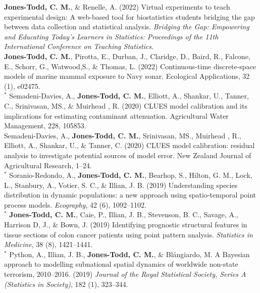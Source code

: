\documentclass[10pt,a4paper]{moderncv}
\begin{document}
  \textbf{Jones-Todd, C. M.}, \& Renelle, A. (2022) Virtual experiments to teach experimental design: A web-based tool for biostatistics students bridging the gap between data collection and statistical analysis. \textit{Bridging the Gap: Empowering and Educating Today's Learners in Statistics: Proceedings of the 11th International Conference on Teaching Statistics}.\\
  
  \textbf{Jones-Todd, C. M.}, Pirotta, E., Durban, J., Claridge, D., Baird, R., Falcone, E., Schorr, G., Watwood,S., \& Thomas, L.  (2022) Continuous-time discrete-space models of marine mammal exposure to Navy sonar. Ecological Applications, 32 (1), e02475.\\
 
  ${}^\ast$ Semadeni-Davies, A., \textbf{Jones-Todd, C. M.},  Elliott, A., Shankar, U., Tanner, C., Srinivasan, MS., \& Muirhead , R. (2020) CLUES model calibration and its implications for estimating contaminant attenuation. Agricultural Water Management, 228, 105853.\\

    Semadeni-Davies, A., \textbf{Jones-Todd, C. M.}, Srinivasan, MS.,  Muirhead , R.,  Elliott, A., Shankar, U., \& Tanner, C. (2020) CLUES model calibration: residual analysis to investigate potential sources of model error. New Zealand Journal of Agricultural Research, 1--24.\\

${}^\ast$ Soranio-Redondo, A., \textbf{Jones-Todd, C. M.}, Bearhop, S., Hilton, G. M., Lock, L., Stanbury, A., Votier, S. C., \& Illian, J. B. (2019) Understanding species distribution in dynamic populations: a new approach using spatio-temporal point process models. \textit{Ecography}, 42 (6), 1092--1102.\\
  
\vspace{-3pt}
${}^\ast$ \textbf{Jones-Todd, C. M.}, Caie, P., Illian, J. B., Stevenson, B. C., Savage, A., Harrison D, J., \& Bown, J. (2019) Identifying prognostic structural features in tissue sections of colon cancer patients using point pattern analysis. \textit{Statistics in Medicine}, 38 (8), 1421--1441.\\

\vspace{-3pt}
${}^\ast$ Python, A.,  Illian, J. B., \textbf{Jones-Todd, C. M.}, \& Bl\'{a}ngiardo, M. A Bayesian approach to modelling subnational spatial dynamics of worldwide non-state terrorism, 2010--2016. (2019) \textit{Journal of the Royal Statistical Society, Series  A (Statistics in Society)}, 182 (1), 323--344.\\
\end{document}
